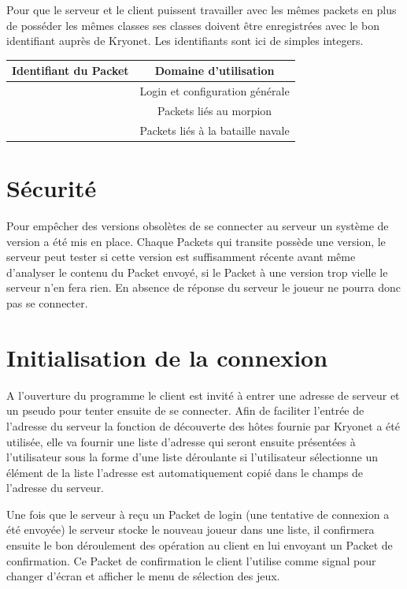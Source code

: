 \documentclass{report}
\begin{document}
Pour que le serveur et le client puissent travailler avec les mêmes packets en plus de
posséder les mêmes classes ses classes doivent être enregistrées avec le bon identifiant auprès de
Kryonet. Les identifiants sont ici de simples integers.

\begin{tabular}{|l|c|}
\hline
 Identifiant du Packet & Domaine d'utilisation \\
\hline [0-999] & Login et configuration générale \\
\hline[1000-1999] & Packets liés au morpion \\
\hline[2000-2999] & Packets liés à la bataille navale \\
\hline
\end{tabular}

\section{Sécurité}
Pour empêcher des versions obsolètes de se connecter au serveur un système de version a été mis en place.
Chaque Packets qui transite possède une version, le serveur peut tester si cette version est suffisamment
récente avant même d'analyser le contenu du Packet envoyé, si le Packet à une version trop vielle le serveur n'en fera rien.
En absence de réponse du serveur le joueur ne pourra donc pas se connecter.


\section{Initialisation de la connexion}
A l'ouverture du programme le client est invité à entrer une adresse de serveur
et un pseudo pour tenter ensuite de se connecter. Afin de faciliter l'entrée de l'adresse du serveur la fonction de
découverte des hôtes fournie par Kryonet a été utilisée, elle va fournir une
liste d'adresse qui seront ensuite présentées à l'utilisateur sous la forme d'une liste déroulante
si l'utilisateur sélectionne un élément de la liste l'adresse est automatiquement copié dans le champs de l'adresse du serveur.

Une fois que le serveur à reçu un Packet de login (une tentative de connexion a
été envoyée) le serveur stocke le nouveau joueur dans une liste, il confirmera ensuite le
bon déroulement des opération au client en lui envoyant un Packet de confirmation.
Ce Packet de confirmation le client l'utilise comme signal pour changer d'écran
et afficher le menu de sélection des jeux.
\end{document}
